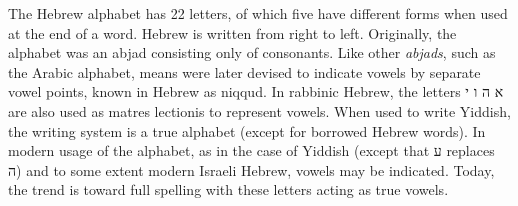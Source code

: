 The Hebrew alphabet has 22 letters, of which five have different forms when used at the end of a word. Hebrew is written from right to left. Originally, the alphabet was an abjad consisting only of consonants. Like other \textit{abjads}, such as the Arabic alphabet, means were later devised to indicate vowels by separate vowel points, known in Hebrew as niqqud. In rabbinic Hebrew, the letters א ה ו י are also used as matres lectionis to represent vowels. When used to write Yiddish, the writing system is a true alphabet (except for borrowed Hebrew words). In modern usage of the alphabet, as in the case of Yiddish (except that ע replaces ה) and to some extent modern Israeli Hebrew, vowels may be indicated. Today, the trend is toward full spelling with these letters acting as true vowels.

